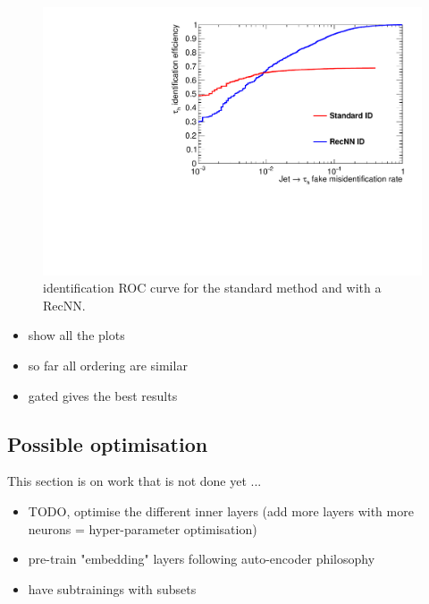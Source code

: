 \begin{figure}
    \centering
    \includegraphics[width=\textwidth]{Images/RecNN_ROC.pdf}
    \caption{\tauh identification ROC curve for the standard method and with a RecNN.}
    \label{fig:RecNN_ROC}
\end{figure}

\begin{itemize}
    \item show all the plots
    \item so far all ordering are similar
    \item gated gives the best results
\end{itemize}

\subsection{Possible optimisation}

This section is on work that is not done yet ...

\begin{itemize}
    \item TODO, optimise the different inner layers (add more layers with more neurons = hyper-parameter optimisation)
    \item pre-train "embedding" layers following auto-encoder philosophy
    \item have subtrainings with subsets 
\end{itemize}
